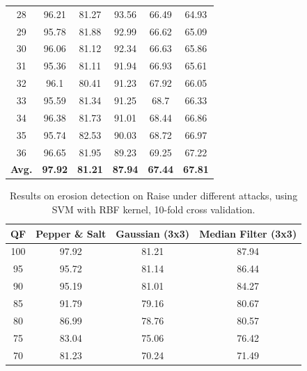 \documentclass[review]{elsarticle}
\begin{document}
\begin{table}[!t]
\begin{tabular}{c|ccccc}
		28&96.21&81.27&93.56&66.49&64.93\\
		29&95.78&81.88&92.99&66.62&65.09\\
		30&96.06&81.12&92.34&66.63&65.86\\
		31&95.36&81.11&91.94&66.93&65.61\\
		32&96.1&80.41&91.23&67.92&66.05\\
		33&95.59&81.34&91.25&68.7&66.33\\
		34&96.38&81.73&91.01&68.44&66.86\\
		35&95.74&82.53&90.03&68.72&66.97\\
		36&96.65&81.95&89.23&69.25&67.22\\
		\hline
		\textbf{Avg.}&\textbf{97.92}&\textbf{81.21}&\textbf{87.94}&\textbf{67.44}&\textbf{67.81}\\
		\hline\hline	
	\end{tabular}
\end{table}


\begin{table}[!t]
	\centering
	\caption{Results on erosion detection on Raise under different attacks, using SVM with RBF kernel, 10-fold cross validation.}
	\label{table:attacks}
	\begin{tabular}{c|ccc}
		\hline\hline
		\textbf{QF} & \textbf{Pepper \& Salt}&\textbf{Gaussian (3x3)}&\textbf{Median Filter (3x3)}\\
		\hline
		100&97.92&81.21&87.94\\
		95&95.72&81.14&86.44\\
		90&95.19&81.01&84.27\\
		85&91.79&79.16&80.67\\
		80&86.99&78.76&80.57\\
		75&83.04&75.06&76.42\\
		70&81.23&70.24&71.49\\
		\hline\hline	
	\end{tabular}
\end{table}
\end{document}
